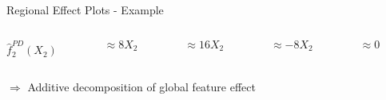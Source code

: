 \documentclass[11pt,compress,t,notes=noshow, aspectratio=169, xcolor=table,dvipsnames]{beamer}
\begin{document}
\begin{frame}{Regional Effect Plots - Example}
\begin{columns}[T, totalwidth = \linewidth]
\begin{column}{0.55\textwidth}
{     \begin{columns}[T, totalwidth = \linewidth]
            \begin{column}{0.1\linewidth}
            \centering
             $\hat{f}_2^{PD}(X_2)$ %
         \end{column}
         \begin{column}{0.18\linewidth}
         \centering
             $\approx 8X_2$ %
         \end{column}
        \begin{column}{0.2\linewidth}
\centering
            $\approx 16X_2$ %
         \end{column}
        \begin{column}{0.2\linewidth}
        \centering
            $ \approx -8X_2$ %
         \end{column}        
         \begin{column}{0.2\linewidth}
         \centering
             $\approx 0$%
         \end{column}
     \end{columns}
     \medskip
     $\Rightarrow$ Additive decomposition of global feature effect
}


    \end{column}

\end{columns}




  

\end{frame}
\end{document}
